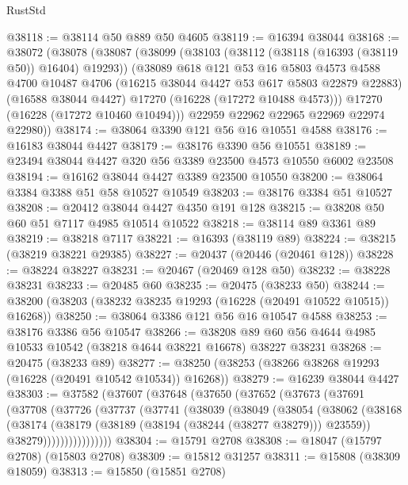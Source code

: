 \begin{lexlean}{RustStd}
\begin{coremodule}
@38118 := @38114 @50 @889 @50 @4605
@38119 := @16394 @38044
@38168 := @38072
    (@38078
      (@38087
        (@38099
          (@38103 (@38112 (@38118 (@16393 (@38119 @50)) @16404) @19293))
          (@38089
            @618
            @121
            @53
            @16
            @5803
            @4573
            @4588
            @4700
            @10487
            @4706
            (@16215 @38044 @4427 @53 @617 @5803 @22879 @22883)
            (@16588 @38044 @4427)
            @17270
            (@16228 (@17272 @10488 @4573)))
          @17270
          (@16228 (@17272 @10460 @10494)))
        @22959
        @22962
        @22965
        @22969
        @22974
        @22980))
@38174 := @38064 @3390 @121 @56 @16 @10551 @4588
@38176 := @16183 @38044 @4427
@38179 := @38176 @3390 @56 @10551
@38189 := @23494 @38044 @4427 @320 @56 @3389 @23500 @4573 @10550 @6002 @23508
@38194 := @16162 @38044 @4427 @3389 @23500 @10550
@38200 := @38064 @3384 @3388 @51 @58 @10527 @10549
@38203 := @38176 @3384 @51 @10527
@38208 := @20412 @38044 @4427 @4350 @191 @128
@38215 := @38208 @50 @60 @51 @7117 @4985 @10514 @10522
@38218 := @38114 @89 @3361 @89
@38219 := @38218 @7117
@38221 := @16393 (@38119 @89)
@38224 := @38215 (@38219 @38221 @29385)
@38227 := @20437 (@20446 (@20461 @128))
@38228 := @38224 @38227
@38231 := @20467 (@20469 @128 @50)
@38232 := @38228 @38231
@38233 := @20485 @60
@38235 := @20475 (@38233 @50)
@38244 := @38200 (@38203 (@38232 @38235 @19293 (@16228 (@20491 @10522 @10515)) @16268))
@38250 := @38064 @3386 @121 @56 @16 @10547 @4588
@38253 := @38176 @3386 @56 @10547
@38266 := @38208 @89 @60 @56 @4644 @4985 @10533 @10542 (@38218 @4644 @38221 @16678) @38227 @38231
@38268 := @20475 (@38233 @89)
@38277 := @38250 (@38253 (@38266 @38268 @19293 (@16228 (@20491 @10542 @10534)) @16268))
@38279 := @16239 @38044 @4427
@38303 := @37582
    (@37607
      (@37648
        (@37650
          (@37652
            (@37673
              (@37691
                (@37708
                  (@37726
                    (@37737
                      (@37741
                        (@38039
                          (@38049
                            (@38054
                              (@38062
                                (@38168
                                  (@38174
                                    (@38179 (@38189 (@38194 (@38244 (@38277 @38279))) @23559))
                                    @38279))))))))))))))))
@38304 := @15791 @2708
@38308 := @18047 (@15797 @2708) (@15803 @2708)
@38309 := @15812 @31257
@38311 := @15808 (@38309 @18059)
@38313 := @15850 (@15851 @2708)

\end{coremodule}
\end{lexlean}
